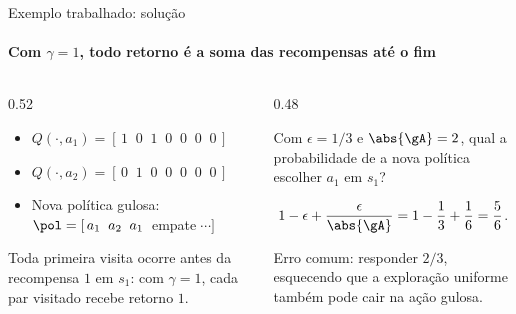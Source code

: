 \documentclass[aspectratio=169, 11pt]{beamer}
\begin{document}
\begin{frame}{Exemplo trabalhado: solução}
  \framesubtitle{Com $\gamma = 1$, todo retorno é a soma das recompensas até o fim}

  \begin{columns}[T]
    \begin{column}{0.52\textwidth}
      \begin{respbox}
        \begin{itemize}\setlength{\itemsep}{0.25ex}
          \item $Q(\cdot, a_1) = [\,1\;\;0\;\;1\;\;0\;\;0\;\;0\;\;0\,]$
          \item $Q(\cdot, a_2) = [\,0\;\;1\;\;0\;\;0\;\;0\;\;0\;\;0\,]$
          \item Nova política gulosa: $\pol = [\,a_1\;\;a_2\;\;a_1\;\;$empate$\;\cdots]$
        \end{itemize}
      \end{respbox}

      \smallskip
      {\footnotesize Toda primeira visita ocorre antes da recompensa $1$
      em $s_1$: com $\gamma=1$, cada par visitado recebe retorno $1$.}
    \end{column}
    \begin{column}{0.48\textwidth}
    
      \begin{quizbox}{}
        Com $\epsilon = 1/3$ e $\abs{\gA} = 2$, qual a probabilidade de a
        nova política escolher $a_1$ em $s_1$?
      \end{quizbox}

      \pause
      \begin{respbox}
        $\;1 - \epsilon + \dfrac{\epsilon}{\abs{\gA}}
          = 1 - \dfrac{1}{3} + \dfrac{1}{6} = \dfrac{5}{6}$.

        \smallskip
        {\footnotesize Erro comum: responder $2/3$, esquecendo que a
        exploração uniforme também pode cair na ação gulosa.}
      \end{respbox}
    \end{column}
  \end{columns}
\end{frame}
\end{document}
